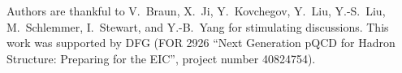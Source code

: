 \documentclass[a4paper, amsfonts, amssymb, amsmath, reprint, showkeys, nofootinbib, twoside]{revtex4-1}
\renewcommand{\(}{\left(}
\renewcommand{\)}{\right)}
\renewcommand{\[}{\left[}
\renewcommand{\]}{\right]}
\begin{document}
\acknowledgements

Authors are thankful to V.~Braun, X.~Ji, Y.~Kovchegov, Y.~Liu, Y.-S.~Liu, M.~Schlemmer, I.~Stewart, and Y.-B.~Yang for stimulating discussions. This work was supported by DFG (FOR 2926 ``Next Generation pQCD for Hadron Structure: Preparing for the EIC'', project number 40824754).


%

\end{document}
